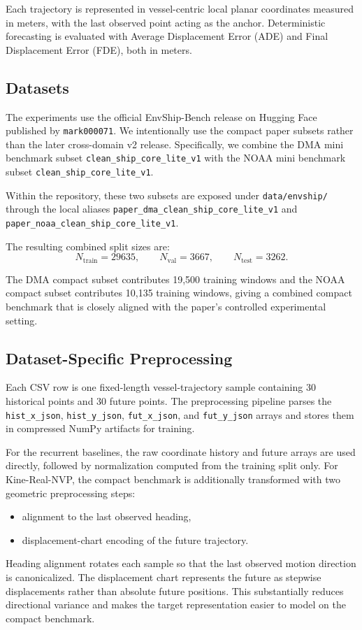 \documentclass[conference]{IEEEtran}
\begin{document}
Each trajectory is represented in vessel-centric local planar coordinates measured in meters, with the last observed point acting as the anchor. Deterministic forecasting is evaluated with Average Displacement Error (ADE) and Final Displacement Error (FDE), both in meters.

\subsection{Datasets}
\label{subsec:datasets}

The experiments use the official EnvShip-Bench release on Hugging Face published by \texttt{mark000071}. We intentionally use the compact paper subsets rather than the later cross-domain v2 release. Specifically, we combine the DMA mini benchmark subset \texttt{clean\_ship\_core\_lite\_v1} with the NOAA mini benchmark subset \texttt{clean\_ship\_core\_lite\_v1}.

Within the repository, these two subsets are exposed under \texttt{data/envship/} through the local aliases \texttt{paper\_dma\_clean\_ship\_core\_lite\_v1} and \texttt{paper\_noaa\_clean\_ship\_core\_lite\_v1}.

The resulting combined split sizes are:
\[
N_{\mathrm{train}} = 29635,\qquad
N_{\mathrm{val}} = 3667,\qquad
N_{\mathrm{test}} = 3262.
\]

The DMA compact subset contributes 19,500 training windows and the NOAA compact subset contributes 10,135 training windows, giving a combined compact benchmark that is closely aligned with the paper's controlled experimental setting.

\subsection{Dataset-Specific Preprocessing}
\label{subsec:dataset_specific_preprocessing}

Each CSV row is one fixed-length vessel-trajectory sample containing 30 historical points and 30 future points. The preprocessing pipeline parses the \texttt{hist\_x\_json}, \texttt{hist\_y\_json}, \texttt{fut\_x\_json}, and \texttt{fut\_y\_json} arrays and stores them in compressed NumPy artifacts for training.

For the recurrent baselines, the raw coordinate history and future arrays are used directly, followed by normalization computed from the training split only. For Kine-Real-NVP, the compact benchmark is additionally transformed with two geometric preprocessing steps:
\begin{itemize}
\item alignment to the last observed heading,
\item displacement-chart encoding of the future trajectory.
\end{itemize}

Heading alignment rotates each sample so that the last observed motion direction is canonicalized. The displacement chart represents the future as stepwise displacements rather than absolute future positions. This substantially reduces directional variance and makes the target representation easier to model on the compact benchmark.
\end{document}
